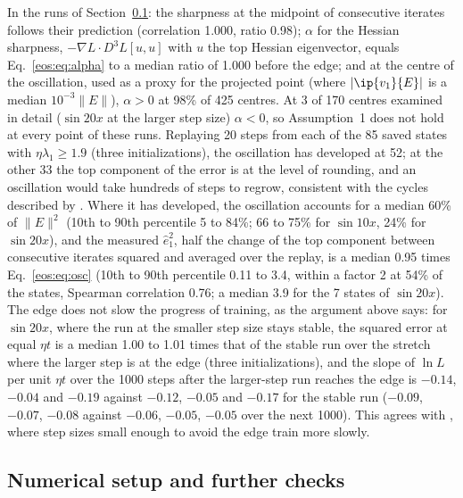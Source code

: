In the runs of Section~\ref{eos:sec:num}: the sharpness at the midpoint of consecutive iterates follows their prediction (correlation 1.000, ratio 0.98); $\alpha$ for the Hessian sharpness, $-\nabla L\cdot D^3L[u,u]$ with $u$ the top Hessian eigenvector, equals Eq.~\eqref{eos:eq:alpha} to a median ratio of 1.000 before the edge; and at the centre of the oscillation, used as a proxy for the projected point (where $|\ip{v_1}{E}|$ is a median $10^{-3}\|E\|$), $\alpha > 0$ at 98\% of 425 centres. At 3 of 170 centres examined in detail ($\sin20x$ at the larger step size) $\alpha < 0$, so Assumption~1 does not hold at every point of these runs.
Replaying 20 steps from each of the 85 saved states with $\eta\lambda_1\ge1.9$ (three initializations), the oscillation has developed at 52; at the other 33 the top component of the error is at the level of rounding, and an oscillation would take hundreds of steps to regrow, consistent with the cycles described by \cite{damian2023}.
Where it has developed, the oscillation accounts for a median 60\% of $\|E\|^2$ (10th to 90th percentile 5 to 84\%; 66 to 75\% for $\sin10x$, 24\% for $\sin20x$), and the measured $\hat e_1^2$, half the change of the top component between consecutive iterates squared and averaged over the replay, is a median 0.95 times Eq.~\eqref{eos:eq:osc} (10th to 90th percentile 0.11 to 3.4, within a factor 2 at 54\% of the states, Spearman correlation 0.76; a median 3.9 for the 7 states of $\sin20x$).
The edge does not slow the progress of training, as the argument above says: for $\sin20x$, where the run at the smaller step size stays stable, the squared error at equal $\eta t$ is a median 1.00 to 1.01 times that of the stable run over the stretch where the larger step is at the edge (three initializations), and the slope of $\ln L$ per unit $\eta t$ over the 1000 steps after the larger-step run reaches the edge is $-0.14$, $-0.04$ and $-0.19$ against $-0.12$, $-0.05$ and $-0.17$ for the stable run ($-0.09$, $-0.07$, $-0.08$ against $-0.06$, $-0.05$, $-0.05$ over the next 1000). This agrees with \cite{cohen2021}, where step sizes small enough to avoid the edge train more slowly.

\subsection{Numerical setup and further checks}\label{eos:sec:num}

